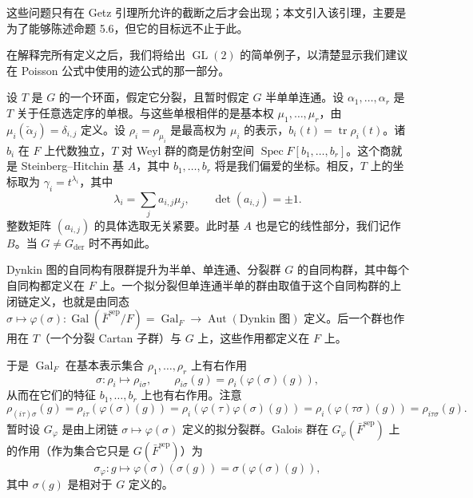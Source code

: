 这些问题只有在 Getz 引理所允许的截断之后才会出现；本文引入该引理，主要是为了能够陈述命题 5.6，但它的目标远不止于此。

在解释完所有定义之后，我们将给出 $\operatorname{GL}(2)$ 的简单例子，以清楚显示我们建议在 Poisson 公式中使用的迹公式的那一部分。

设 $T$ 是 $G$ 的一个环面，假定它分裂，且暂时假定 $G$ 半单单连通。设 $\alpha_1,\dots,\alpha_r$ 是 $T$ 关于任意选定序的单根。与这些单根相伴的是基本权 $\mu_1,\dots,\mu_r$，由 $\mu_i(\check\alpha_j)=\delta_{i,j}$ 定义。设 $\rho_i=\rho_{\mu_i}$ 是最高权为 $\mu_i$ 的表示，$b_i(t)=\operatorname{tr}\rho_i(t)$。诸 $b_i$ 在 $F$ 上代数独立，$T$ 对 Weyl 群的商是仿射空间 $\operatorname{Spec}F[b_1,\dots,b_r]$。这个商就是 Steinberg–Hitchin 基 $A$，其中 $b_1,\dots,b_r$ 将是我们偏爱的坐标。相反，$T$ 上的坐标取为 $\gamma_i=t^{\lambda_i}$，其中
\begin{equation}\tag{3.13}
\lambda_i=\sum_ja_{i,j}\mu_j,\qquad \det(a_{i,j})=\pm1.
\end{equation}
整数矩阵 $(a_{i,j})$ 的具体选取无关紧要。此时基 $A$ 也是它的线性部分，我们记作 $B$。当 $G\ne G_{\mathrm{der}}$ 时不再如此。

Dynkin 图的自同构有限群提升为半单、单连通、分裂群 $G$ 的自同构群，其中每个自同构都定义在 $F$ 上。一个拟分裂但单连通半单的群由取值于这个自同构群的上闭链定义，也就是由同态 $\sigma\mapsto\varphi(\sigma):\operatorname{Gal}(\bar F^{\mathrm{sep}}/F)=\operatorname{Gal}_F\to\operatorname{Aut}(\text{Dynkin 图})$ 定义。后一个群也作用在 $T$（一个分裂 Cartan 子群）与 $G$ 上，这些作用都定义在 $F$ 上。

于是 $\operatorname{Gal}_F$ 在基本表示集合 $\rho_1,\dots,\rho_r$ 上有右作用
\[
\sigma:\rho_i\mapsto\rho_{i\sigma},\qquad
\rho_{i\sigma}(g)=\rho_i(\varphi(\sigma)(g)),
\]
从而在它们的特征 $b_1,\dots,b_r$ 上也有右作用。注意
\[
\rho_{(i\tau)\sigma}(g)=\rho_{i\tau}(\varphi(\sigma)(g))
=\rho_i(\varphi(\tau)\varphi(\sigma)(g))
=\rho_i(\varphi(\tau\sigma)(g))=\rho_{i\tau\sigma}(g).
\]
暂时设 $G_\varphi$ 是由上闭链 $\sigma\mapsto\varphi(\sigma)$ 定义的拟分裂群。Galois 群在 $G_\varphi(\bar F^{\mathrm{sep}})$ 上的作用（作为集合它只是 $G(\bar F^{\mathrm{sep}})$）为
\[
\sigma_\varphi:g\mapsto\varphi(\sigma)(\sigma(g))=\sigma(\varphi(\sigma)(g)),
\]
其中 $\sigma(g)$ 是相对于 $G$ 定义的。

